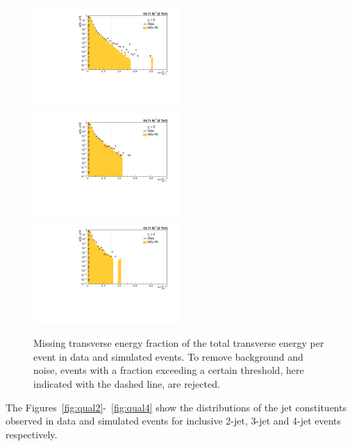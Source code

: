 \begin{figure}[!htbp]
  \begin{center}
    \includegraphics[width=0.5\textwidth]{Plots_HT_2_150/Qual/Missing_ET_2_HT_2_150.pdf}\\
    \includegraphics[width=0.5\textwidth]{Plots_HT_2_150/Qual/Missing_ET_3_HT_2_150.pdf}%
    \includegraphics[width=0.5\textwidth]{Plots_HT_2_150/Qual/Missing_ET_4_HT_2_150.pdf}\\
    \caption{Missing transverse energy fraction of the total transverse energy per event
      in data and simulated events. To remove background and noise, events with a fraction
      exceeding a certain threshold, here indicated with the dashed line, are rejected.}
    \label{fig:metcut}
  \end{center}
\end{figure} 

The Figures~\ref{fig:qual2}-~\ref{fig:qual4} show the distributions of the jet constituents observed in data and simulated events for 
inclusive 2-jet, 3-jet and 4-jet events respectively.

